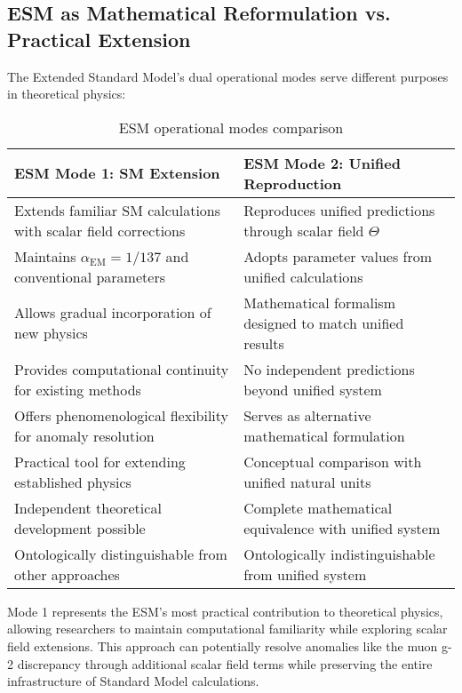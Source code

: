 \documentclass[12pt,a4paper]{article}
\newcommand{\alphaEM}{\alpha_{\text{EM}}}
\begin{document}
	\subsection{ESM as Mathematical Reformulation vs. Practical Extension}
	\label{subsec:esm_reformulation_vs_extension}
	
	The Extended Standard Model's dual operational modes serve different purposes in theoretical physics:
	
	\begin{table}[ht]
		\centering
		\caption{ESM operational modes comparison}
		\label{tab:esm_modes_comparison}
		\begin{tabular}{p{}|p{}}
			\hline
			\textbf{ESM Mode 1: SM Extension} & \textbf{ESM Mode 2: Unified Reproduction} \\
			\hline
			Extends familiar SM calculations with scalar field corrections & Reproduces unified predictions through scalar field $\Theta$ \\
			\hline
			Maintains $\alphaEM = 1/137$ and conventional parameters & Adopts parameter values from unified calculations \\
			\hline
			Allows gradual incorporation of new physics & Mathematical formalism designed to match unified results \\
			\hline
			Provides computational continuity for existing methods & No independent predictions beyond unified system \\
			\hline
			Offers phenomenological flexibility for anomaly resolution & Serves as alternative mathematical formulation \\
			\hline
			Practical tool for extending established physics & Conceptual comparison with unified natural units \\
			\hline
			Independent theoretical development possible & Complete mathematical equivalence with unified system \\
			\hline
			Ontologically distinguishable from other approaches & Ontologically indistinguishable from unified system \cite{Duhem1906} \\
			\hline
		\end{tabular}
	\end{table}
	
	Mode 1 represents the ESM's most practical contribution to theoretical physics, allowing researchers to maintain computational familiarity while exploring scalar field extensions. This approach can potentially resolve anomalies like the muon g-2 discrepancy \cite{pascher_muon_g2_2025} through additional scalar field terms while preserving the entire infrastructure of Standard Model calculations.
	
\end{document}

